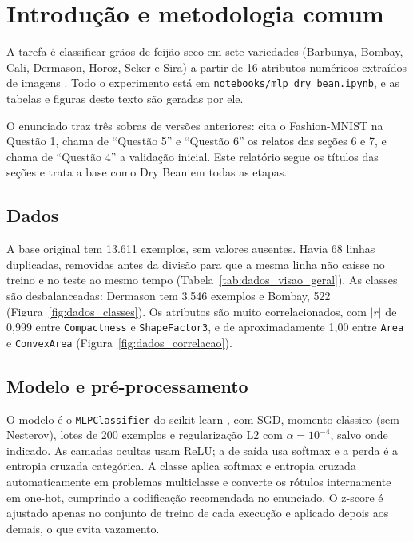 \section{Introdução e metodologia comum}

A tarefa é classificar grãos de feijão seco em sete variedades (Barbunya, Bombay, Cali, Dermason, Horoz, Seker e
Sira) a partir de 16 atributos numéricos extraídos de imagens \cite{koklu2020,uci}. Todo o experimento está em
\texttt{notebooks/mlp\_dry\_bean.ipynb}, e as tabelas e figuras deste texto são geradas por ele.

O enunciado traz três sobras de versões anteriores: cita o Fashion-MNIST na Questão 1, chama de ``Questão 5'' e
``Questão 6'' os relatos das seções 6 e 7, e chama de ``Questão 4'' a validação inicial. Este relatório segue os títulos
das seções e trata a base como Dry Bean em todas as etapas.

\subsection{Dados}

A base original tem 13.611 exemplos, sem valores ausentes. Havia 68 linhas duplicadas, removidas antes da divisão para
que a mesma linha não caísse no treino e no teste ao mesmo tempo (Tabela~\ref{tab:dados_visao_geral}). As classes são
desbalanceadas: Dermason tem 3.546 exemplos e Bombay, 522 (Figura~\ref{fig:dados_classes}). Os atributos são muito
correlacionados, com $|r|$ de 0,999 entre \texttt{Compactness} e \texttt{ShapeFactor3}, e de aproximadamente 1,00 entre
\texttt{Area} e \texttt{ConvexArea} (Figura~\ref{fig:dados_correlacao}).


\subsection{Modelo e pré-processamento}

O modelo é o \texttt{MLPClassifier} do scikit-learn \cite{sklearn}, com SGD, momento clássico (sem Nesterov), lotes de 200
exemplos e regularização L2 com $\alpha = 10^{-4}$, salvo onde indicado. As camadas ocultas usam ReLU; a de saída usa
softmax e a perda é a entropia cruzada categórica. A classe aplica softmax e entropia cruzada automaticamente em
problemas multiclasse e converte os rótulos internamente em one-hot, cumprindo a codificação recomendada no enunciado.
O z-score é ajustado apenas no conjunto de treino de cada execução e aplicado depois aos demais, o que evita vazamento.

